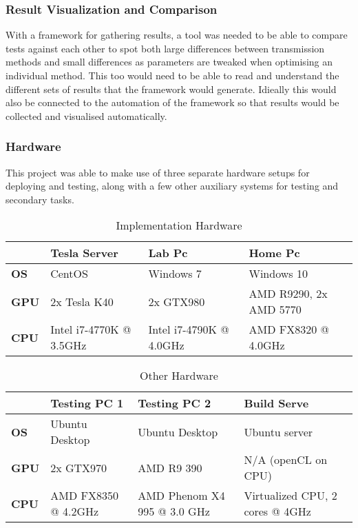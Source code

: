 \documentclass[12pt,a4paper]{article}
\begin{document}
\subsubsection{Result Visualization and Comparison}
With a framework for gathering results, a tool was needed to be able to compare tests against each other to spot both large differences between transmission methods and small differences as parameters are tweaked when optimising an individual method. This too would need to be able to read and understand the different sets of results that the framework would generate. Idieally this would also be connected to the automation of the framework so that results would be collected and visualised automatically.

\subsubsection{Hardware}
This project was able to make use of three separate hardware setups for deploying and testing, along with a few other auxiliary systems for testing and secondary tasks.

\begin{table*}[h]\centering
\begin{tabular}{p{0.8cm}lll}\toprule
 & Tesla Server & Lab Pc & Home Pc \\ \midrule
\textbf{OS} & CentOS & Windows 7 & Windows 10\\
\textbf{GPU} & 2x Tesla K40 & 2x GTX980 & AMD R9290, 2x AMD 5770\\
\textbf{CPU} & Intel i7-4770K @ 3.5GHz & Intel i7-4790K @ 4.0GHz & AMD FX8320 @ 4.0GHz \\
\bottomrule
	\end{tabular}
	\caption{Implementation Hardware}
\end{table*}

\begin{table*}[h]\centering
	\begin{tabular}{p{0.8cm}p{4.5cm}p{4.7cm}p{4.8cm}}\toprule
		& Testing PC 1 & Testing PC 2 & Build Serve \\ \midrule
		\textbf{OS} & Ubuntu Desktop & Ubuntu Desktop & Ubuntu server\\
		\textbf{GPU} & 2x GTX970 & AMD R9 390 & N/A (openCL on CPU)\\
		\textbf{CPU} & AMD FX8350 @ 4.2GHz &AMD Phenom X4 995 @ 3.0 GHz & Virtualized CPU, 2 cores @ 4GHz \\
		\bottomrule
	\end{tabular}
	\caption{Other Hardware}
\end{table*}
\end{document}
